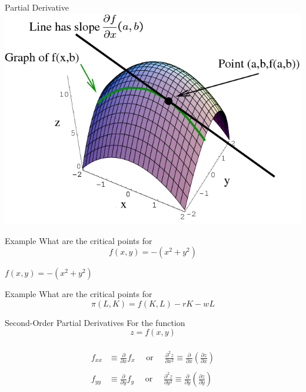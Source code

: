 \documentclass{./../../Latex/teaching_slides}
\begin{document}
\begin{frame}{Partial Derivative}
\vspace{1em}
\centering
\includegraphics[scale=0.4]{3dpartial.png}
\end{frame}

\begin{frame}{Example}
What are the critical points for
$$ f(x, y) = - (x^2 + y^2) $$
\end{frame}


\begin{frame}{$ f(x, y) = - (x^2 + y^2)$}
\begin{center}
\end{center}
\end{frame}

\begin{frame}{Example}
What are the critical points for
$$ \pi(L, K) = f(K,L)- rK-wL $$
\end{frame}


\begin{frame}{Second-Order Partial Derivatives}
For the function 
$$ z= f(x, y) $$ \\
$$
\begin{aligned}
f_{x x} & \equiv \frac{\partial}{\partial x} f_{x} \quad \text{ or } \quad \frac{\partial^{2} z}{\partial x^{2}} \equiv \frac{\partial}{\partial x}\left(\frac{\partial z}{\partial x}\right)  \\~\\
f_{y y} & \equiv \frac{\partial}{\partial y} f_{y} \quad \text{ or } \quad \frac{\partial^{2} z}{\partial y^{2}} \equiv \frac{\partial}{\partial y}\left(\frac{\partial z}{\partial y}\right)  \\
\end{aligned}
$$
\end{frame}
\end{document}
